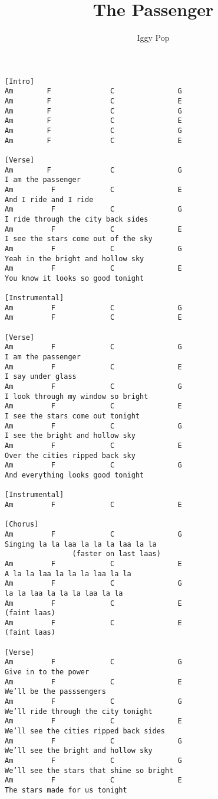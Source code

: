 \documentclass{article}
\title{The Passenger}
\date{}
\author{Iggy Pop}
\begin{document}
\maketitle
\begin{verbatim}
[Intro]
Am        F              C               G
Am        F              C               E
Am        F              C               G
Am        F              C               E
Am        F              C               G
Am        F              C               E

[Verse]
Am        F              C               G
I am the passenger
Am         F             C               E
And I ride and I ride
Am         F             C               G
I ride through the city back sides
Am         F             C               E
I see the stars come out of the sky
Am         F             C               G
Yeah in the bright and hollow sky
Am         F             C               E
You know it looks so good tonight

[Instrumental]
Am         F             C               G
Am         F             C               E

[Verse]
Am         F             C               G
I am the passenger
Am         F             C               E
I say under glass
Am         F             C               G
I look through my window so bright
Am         F             C               E
I see the stars come out tonight
Am         F             C               G
I see the bright and hollow sky
Am         F             C               E
Over the cities ripped back sky
Am         F             C               G
And everything looks good tonight

[Instrumental]
Am         F             C               E

[Chorus]
Am         F             C               G
Singing la la laa la la la laa la la 
                (faster on last laas)
Am         F             C               E
A la la laa la la la laa la la
Am         F             C               G
la la laa la la la laa la la
Am         F             C               E
(faint laas)
Am         F             C               E
(faint laas)

[Verse]
Am         F             C               G
Give in to the power
Am         F             C               E
We’ll be the passsengers
Am         F             C               G
We’ll ride through the city tonight
Am         F             C               E
We’ll see the cities ripped back sides
Am         F             C               G
We’ll see the bright and hollow sky
Am         F             C               G
We’ll see the stars that shine so bright
Am         F             C               E
The stars made for us tonight


\end{verbatim}
\end{document}
